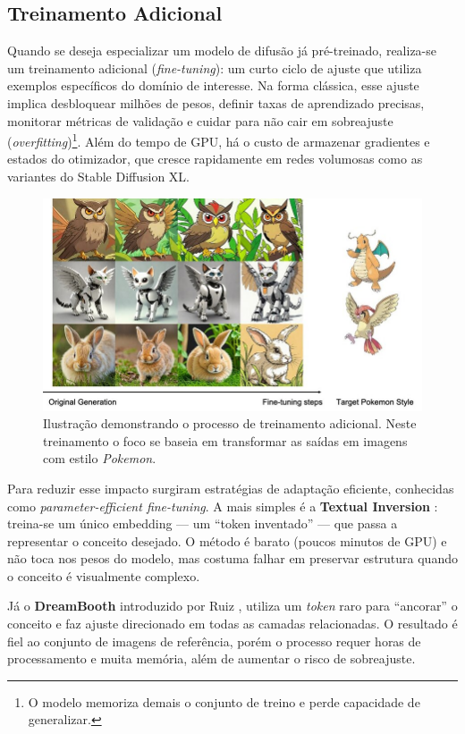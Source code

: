 \documentclass[12pt, %
openright, 
oneside, %
a4paper,    %
brazil]{facom-ufu-abntex2}
\begin{document}
\subsection{Treinamento Adicional}

Quando se deseja especializar um modelo de difusão já pré-treinado, realiza-se um treinamento adicional (\emph{fine-tuning}): um curto ciclo de ajuste que utiliza exemplos específicos do domínio de interesse. Na forma clássica, esse ajuste implica desbloquear milhões de pesos, definir taxas de aprendizado precisas, monitorar métricas de validação e cuidar para não cair em sobreajuste (\textit{overfitting})\footnote{O modelo memoriza demais o conjunto de treino e perde capacidade de generalizar.}. Além do tempo de GPU, há o custo de armazenar gradientes e estados do otimizador, que cresce rapidamente em redes volumosas como as variantes do Stable Diffusion XL.

\begin{figure}[H]
    \centering
    \includegraphics[width=0.9\linewidth]{finetuning-1.png}
    \caption{Ilustração demonstrando o processo de treinamento adicional. Neste treinamento o foco se baseia em transformar as saídas em imagens com estilo \textit{Pokemon}.}
    \label{fig:finetuning1}
\end{figure}

Para reduzir esse impacto surgiram estratégias de adaptação eficiente, conhecidas como \textit{parameter-efficient fine-tuning}. A mais simples é a \textbf{Textual Inversion} \cite{gal2022imageworthwordpersonalizing}: treina-se um único embedding — um ``token inventado'' — que passa a representar o conceito desejado. O método é barato (poucos minutos de GPU) e não toca nos pesos do modelo, mas costuma falhar em preservar estrutura quando o conceito é visualmente complexo.

Já o \textbf{DreamBooth} introduzido por Ruiz \cite{ruiz2023dreamboothfinetuningtexttoimage}, utiliza um \emph{token} raro para ``ancorar'' o conceito e faz ajuste direcionado em todas as camadas relacionadas. O resultado é fiel ao conjunto de imagens de referência, porém o processo requer horas de processamento e muita memória, além de aumentar o risco de sobreajuste.
\end{document}
